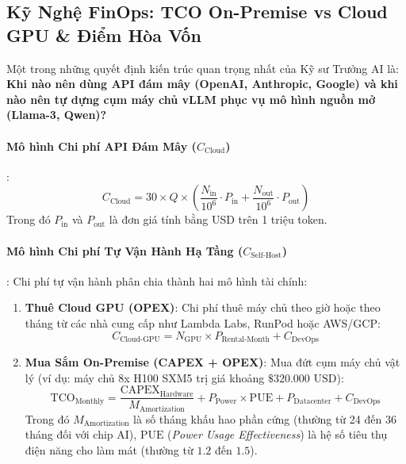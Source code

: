 \subsection{Kỹ Nghệ FinOps: TCO On-Premise vs Cloud GPU \& Điểm Hòa Vốn}

Một trong những quyết định kiến trúc quan trọng nhất của Kỹ sư Trưởng AI là: \textbf{Khi nào nên dùng API đám mây (OpenAI, Anthropic, Google) và khi nào nên tự dựng cụm máy chủ vLLM phục vụ mô hình nguồn mở (Llama-3, Qwen)?}

\paragraph{Mô hình Chi phí API Đám Mây ($C_{\text{Cloud}}$)}:
\begin{equation}
C_{\text{Cloud}} = 30 \times Q \times \left( \frac{N_{\text{in}}}{10^6} \cdot P_{\text{in}} + \frac{N_{\text{out}}}{10^6} \cdot P_{\text{out}} \right)
\label{eq:cloud-cost}
\end{equation}
Trong đó $P_{\text{in}}$ và $P_{\text{out}}$ là đơn giá tính bằng USD trên 1 triệu token.

\paragraph{Mô hình Chi phí Tự Vận Hành Hạ Tầng ($C_{\text{Self-Host}}$)}:
Chi phí tự vận hành phân chia thành hai mô hình tài chính:
\begin{enumerate}
  \item \textbf{Thuê Cloud GPU (OPEX)}: Chi phí thuê máy chủ theo giờ hoặc theo tháng từ các nhà cung cấp như Lambda Labs, RunPod hoặc AWS/GCP:
  \begin{equation}
  C_{\text{Cloud-GPU}} = N_{\text{GPU}} \times P_{\text{Rental-Month}} + C_{\text{DevOps}}
  \end{equation}
  \item \textbf{Mua Sắm On-Premise (CAPEX + OPEX)}: Mua đứt cụm máy chủ vật lý (ví dụ: máy chủ 8x H100 SXM5 trị giá khoảng $\$320.000\text{ USD}$):
  \begin{equation}
  \text{TCO}_{\text{Monthly}} = \frac{\text{CAPEX}_{\text{Hardware}}}{M_{\text{Amortization}}} + P_{\text{Power}} \times \text{PUE} + P_{\text{Datacenter}} + C_{\text{DevOps}}
  \label{eq:tco-onprem}
  \end{equation}
  Trong đó $M_{\text{Amortization}}$ là số tháng khấu hao phần cứng (thường từ 24 đến 36 tháng đối với chip AI), $\text{PUE}$ (\textit{Power Usage Effectiveness}) là hệ số tiêu thụ điện năng cho làm mát (thường từ $1.2$ đến $1.5$).
\end{enumerate}

